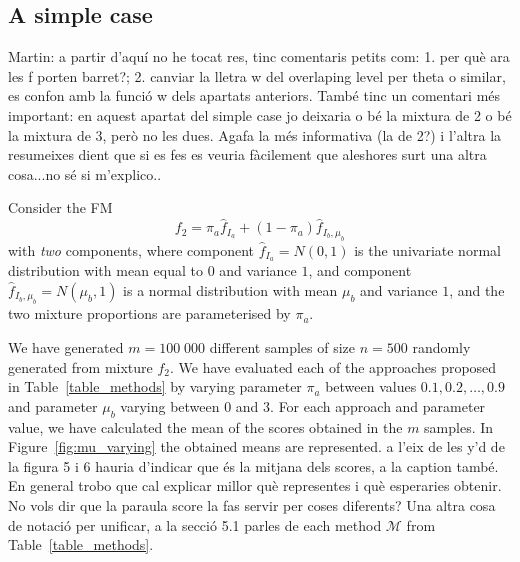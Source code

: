\documentclass[10pt, a4paper]{article}
\begin{document}
\begin{spacing}{1.9}
\subsection{A simple case}

{\color{blue} Martin: a partir d'aquí no he tocat res, tinc comentaris petits com: 1. per què ara les f porten barret?; 2. canviar la lletra w del overlaping level per theta o similar, es confon amb la funció w dels apartats anteriors. També tinc un comentari més important: en aquest apartat del simple case jo deixaria o bé la mixtura de 2 o bé la mixtura de 3, però no les dues. Agafa la més informativa (la de 2?) i l'altra la resumeixes dient que si es fes es veuria fàcilement que aleshores surt una altra cosa...no sé si m'explico..}

Consider the FM
\begin{equation}\label{two_mixture}
f_2 = \pi_a \hat{f}_{I_a} + (1 - \pi_a) \hat{f}_{I_b, \mu_b}
\end{equation}
with \emph{two} components, where component $\hat{f}_{I_a} = N(0, 1)$ is the univariate normal distribution with mean equal to $0$ and variance $1$, and component $\hat{f}_{I_b, \mu_b} = N(\mu_b, 1)$ is a normal distribution with mean $\mu_b$ and variance $1$, and the two mixture proportions are parameterised by $\pi_a$.

We have generated $m=100\;000$ different samples of size $n=500$ randomly generated from mixture $f_2$. We have evaluated each of the approaches proposed in Table~\ref{table_methods} by varying parameter $\pi_a$ between values $0.1, 0.2, \dots, 0.9$ and parameter $\mu_b$ varying between $0$ and $3$. For each approach and parameter value, we have calculated the mean of the scores obtained in the $m$ samples. In Figure~\ref{fig:mu_varying} the obtained means are represented. {\color{blue} a l'eix de les y'd de la figura 5 i 6 hauria d'indicar que \'{e}s la mitjana dels scores, a la caption tamb\'{e}. En general trobo que cal explicar millor qu\`{e} representes i qu\`{e} esperaries obtenir. No vols dir que la paraula score la fas servir per coses diferents? Una altra cosa de notaci\'{o} per unificar, a la secci\'{o} 5.1 parles de each method $\mathcal{M}$ from Table~\ref{table_methods}.}


\end{spacing}
\end{document}
